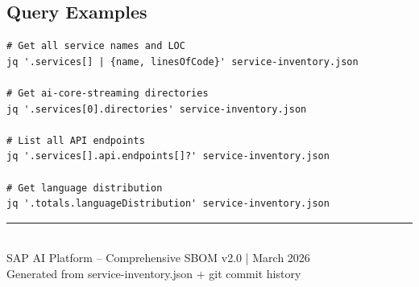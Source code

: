 \documentclass[11pt,a4paper]{article}
\begin{document}
\subsection{Query Examples}

\begin{lstlisting}
# Get all service names and LOC
jq '.services[] | {name, linesOfCode}' service-inventory.json

# Get ai-core-streaming directories
jq '.services[0].directories' service-inventory.json

# List all API endpoints
jq '.services[].api.endpoints[]?' service-inventory.json

# Get language distribution
jq '.totals.languageDistribution' service-inventory.json
\end{lstlisting}

\newpage



\vfill
\begin{center}
\textcolor{sapblue}{\rule{0.8\textwidth}{0.4pt}}\\[0.5cm]
{\small SAP AI Platform -- Comprehensive SBOM v2.0 | March 2026}\\
{\small Generated from service-inventory.json + git commit history}
\end{center}
\end{document}

